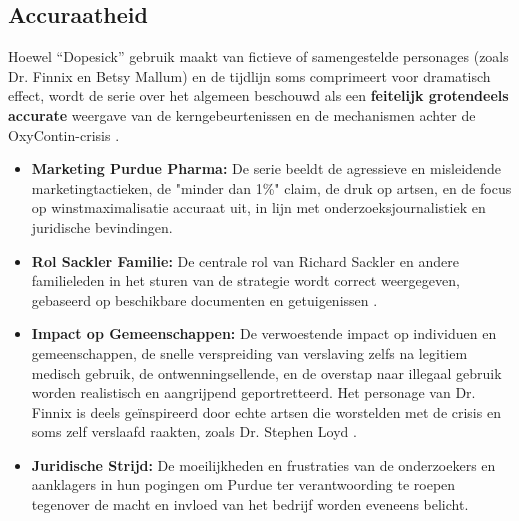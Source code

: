 \documentclass[11pt, a4paper]{report} %
\begin{document}
\subsection{Accuraatheid}
Hoewel \enquote{Dopesick} gebruik maakt van fictieve of samengestelde personages (zoals Dr. Finnix en Betsy Mallum) en de tijdlijn soms comprimeert voor dramatisch effect, wordt de serie over het algemeen beschouwd als een \textbf{feitelijk grotendeels accurate} weergave van de kerngebeurtenissen en de mechanismen achter de OxyContin-crisis \parencite{AvenuesRecoveryDopesickTrue}.
\begin{itemize}
    \item \textbf{Marketing Purdue Pharma:} De serie beeldt de agressieve en misleidende marketingtactieken, de "minder dan 1\%" claim, de druk op artsen, en de focus op winstmaximalisatie accuraat uit, in lijn met onderzoeksjournalistiek en juridische bevindingen.
    \item \textbf{Rol Sackler Familie:} De centrale rol van Richard Sackler en andere familieleden in het sturen van de strategie wordt correct weergegeven, gebaseerd op beschikbare documenten en getuigenissen \parencite{WikipediaRichardSackler}.
    \item \textbf{Impact op Gemeenschappen:} De verwoestende impact op individuen en gemeenschappen, de snelle verspreiding van verslaving zelfs na legitiem medisch gebruik, de ontwenningsellende, en de overstap naar illegaal gebruik worden realistisch en aangrijpend geportretteerd. Het personage van Dr. Finnix is deels geïnspireerd door echte artsen die worstelden met de crisis en soms zelf verslaafd raakten, zoals Dr. Stephen Loyd \parencite{HealthlineDopesickTruth}.
    \item \textbf{Juridische Strijd:} De moeilijkheden en frustraties van de onderzoekers en aanklagers in hun pogingen om Purdue ter verantwoording te roepen tegenover de macht en invloed van het bedrijf worden eveneens belicht.
\end{itemize}
\end{document}
